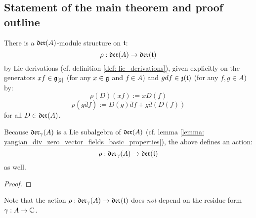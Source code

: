     \subsection{Statement of the main theorem and proof outline}
        \begin{lemma} \label{lemma: a_fixed_yangian_div_zero_vector_field_action} 
            There is a $\mathfrak{der}(A)$-module structure on $\mathfrak{t}$:
                $$\rho: \mathfrak{der}(A) \to \mathfrak{der}(\mathfrak{t})$$
            by Lie derivations (cf. definition \ref{def: lie_derivations}), given explicitly on the generators $xf \in \mathfrak{g}_{[2]}$ (for any $x \in \mathfrak{g}$ and $f \in A$) and $g \bar{d}f \in \mathfrak{z}(\mathfrak{t})$ (for any $f, g \in A$) by:
                $$\rho(D)( xf ) := x D(f)$$
                $$\rho( g\bar{d}f ) := D(g) \bar{d}f + g \bar{d}(D(f))$$
            for all $D \in \mathfrak{der}(A)$.
            
            Because $\mathfrak{der}_{\gamma}(A)$ is a Lie subalgebra of $\mathfrak{der}(A)$ (cf. lemma \ref{lemma: yangian_div_zero_vector_fields_basic_properties}), the above defines an action:
                $$\rho: \mathfrak{der}_{\gamma}(A) \to \mathfrak{der}(\mathfrak{t})$$
            as well.
        \end{lemma}
            \begin{proof}
            \end{proof}
        \begin{remark}
            Note that the action $\rho: \mathfrak{der}_{\gamma}(A) \to \mathfrak{der}(\mathfrak{t})$ does \textit{not} depend on the residue form $\gamma: A \to \mathbb{C}$.
        \end{remark}
            

